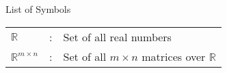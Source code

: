\begin{preface}{List of Symbols}
\begin{longtable}{lcl}
$\mathbb{R}$ & : & Set of all real numbers \\
$\mathbb{R}^{m\times n}$ & : & Set of all $m\times n$ matrices over $\mathbb{R}$
\end{longtable}
\end{preface}